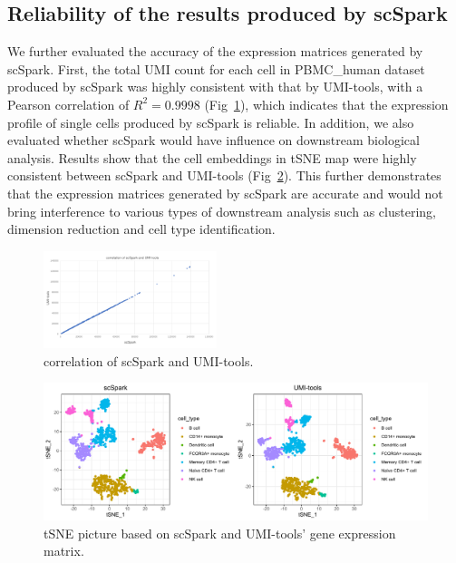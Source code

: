 \documentclass[conference]{IEEEtran}
\begin{document}
\subsection{Reliability of the results produced by scSpark} 
We further evaluated the accuracy of the expression matrices generated by scSpark.
First, the total UMI count for each cell in PBMC\_human dataset produced by scSpark was highly consistent with that by UMI-tools, with a Pearson correlation of $R^{2} = 0.9998$ (Fig~\ref{fig9}), which indicates that the expression profile of single cells produced by scSpark is reliable. In addition, we also evaluated whether scSpark would have influence on downstream biological analysis. Results show that the cell embeddings in tSNE map were highly consistent between scSpark and UMI-tools (Fig~\ref{fig10}). This further demonstrates that the expression matrices generated by scSpark are accurate and would not bring interference to various types of downstream analysis such as clustering, dimension reduction and cell type identification.
\begin{figure}
  \includegraphics[width=0.45\textwidth]{fig9.pdf}
  \caption{correlation of scSpark and UMI-tools.} \label{fig9}
\end{figure}
\begin{figure}
  \includegraphics[width=\textwidth]{fig10.pdf}
  \caption{tSNE picture based on scSpark and UMI-tools' gene expression matrix.} \label{fig10}
\end{figure}
\end{document}
